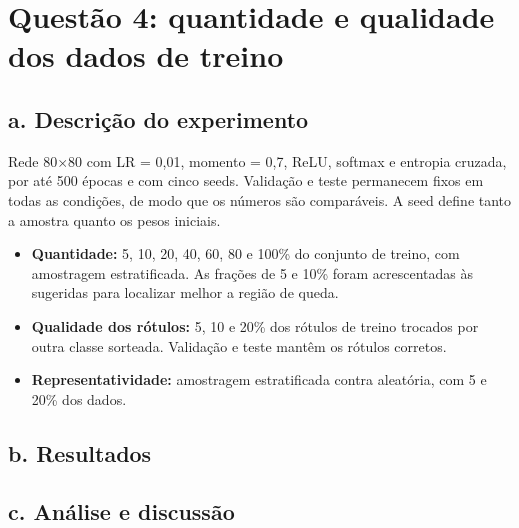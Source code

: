 \section{Questão 4: quantidade e qualidade dos dados de treino}

\subsection*{a. Descrição do experimento}

Rede 80$\times$80 com LR = 0,01, momento = 0,7, ReLU, softmax e entropia cruzada, por até 500 épocas e com cinco seeds. Validação e teste permanecem fixos em todas as
condições, de modo que os números são comparáveis. A seed define tanto a amostra quanto os pesos iniciais.

\begin{itemize}
  \item \textbf{Quantidade:} 5, 10, 20, 40, 60, 80 e 100\% do conjunto de treino, com amostragem estratificada. As frações de 5 e 10\% foram acrescentadas às sugeridas para localizar melhor a região de queda.
  \item \textbf{Qualidade dos rótulos:} 5, 10 e 20\% dos rótulos de treino trocados por outra classe sorteada. Validação e teste mantêm os rótulos corretos.
  \item \textbf{Representatividade:} amostragem estratificada contra aleatória, com 5 e 20\% dos dados.
\end{itemize}

\subsection*{b. Resultados}


\subsection*{c. Análise e discussão}

